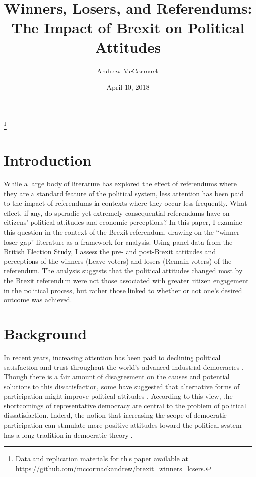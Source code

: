 \documentclass[12pt, letter]{article}
\title{{\myfont Winners, Losers, and Referendums:} \\ {\myfont The Impact of Brexit on Political Attitudes}}
\date{April 10, 2018}
\author{Andrew McCormack}
\newcommand\blfootnote[1]{%
  \begingroup
  \renewcommand\thefootnote{}\footnote{#1}%
  \addtocounter{footnote}{-1}%
  \endgroup
}
\begin{document}
\singlespacing
\begin{titlepage}
\maketitle

\blfootnote{Data and replication materials for this paper available at \url{https://github.com/mccormackandrew/brexit_winners_losers}.}
\end{titlepage}



\section{Introduction}
\doublespacing
While a large body of literature has explored the effect of referendums where they are a standard feature of the political system, less attention has been paid to the impact of referendums in contexts where they occur less frequently. What effect, if any, do sporadic yet extremely consequential referendums have on citizens' political attitudes and economic perceptions? In this paper, I examine this question in the context of the Brexit referendum, drawing on the ``winner-loser gap'' literature as a framework for analysis. Using panel data from the British Election Study, I assess the pre- and post-Brexit attitudes and perceptions of the winners (Leave voters) and losers (Remain voters) of the referendum. The analysis suggests that the political attitudes changed most by the Brexit referendum were not those associated with greater citizen engagement in the political process, but rather those linked to whether or not one's desired outcome was achieved. 



\singlespacing
\section{Background}
\doublespacing

In recent years, increasing attention has been paid to declining political satisfaction and trust throughout the world's advanced industrial democracies \parencite{norris1999critical, pharr2000quarter}. Though there is a fair amount of disagreement on the causes and potential solutions to this dissatisfaction, some have suggested that alternative forms of participation might improve political attitudes \parencite{finkel1985reciprocal, bowler2002democracy}. According to this view, the shortcomings of representative democracy are central to the problem of political dissatisfaction. Indeed, the notion that increasing the scope of democratic participation can stimulate more positive attitudes toward the political system has a long tradition in democratic theory \parencite{pateman1970participation, barber2003strong}.
\end{document}
